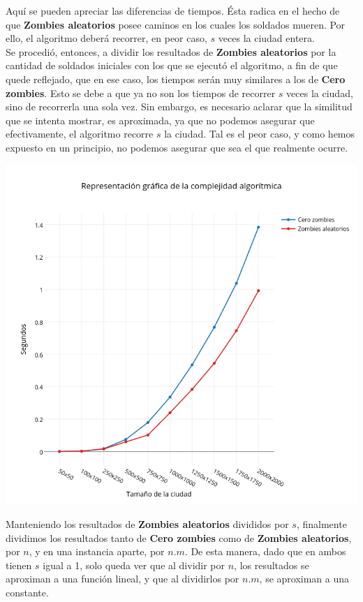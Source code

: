 Aquí se pueden apreciar las diferencias de tiempos. Ésta radica en el hecho de que \textbf{Zombies aleatorios} posee caminos en los cuales los soldados mueren. Por ello, el algoritmo deberá recorrer, en peor caso, $s$ veces la ciudad entera.\\

Se procedió, entonces, a dividir los resultados de \textbf{Zombies aleatorios} por la cantidad de soldados iniciales con los que se ejecutó el algoritmo, a fin de que quede reflejado, que en ese caso, los tiempos serán muy similares a los de \textbf{Cero zombies}. Esto se debe a que ya no son los tiempos de recorrer $s$ veces la ciudad, sino de recorrerla una sola vez.
Sin embargo, es necesario aclarar que la similitud que se intenta mostrar, es aproximada, ya que no podemos asegurar que efectivamente, el algoritmo recorre $s$ la ciudad. Tal es el peor caso, y como hemos expuesto en un principio, no podemos asegurar que sea el que realmente ocurre.

\includegraphics[width=15cm,keepaspectratio=yes]{imagenes/ej2/zaczados.png}

Manteniendo los resultados de \textbf{Zombies aleatorios} divididos por $s$, finalmente dividimos los resultados tanto de \textbf{Cero zombies} como de \textbf{Zombies aleatorios}, por $n$, y en una instancia aparte, por $n.m$.
De esta manera, dado que en ambos tienen $s$ igual a 1, solo queda ver que al dividir por $n$, los resultados se aproximan a una función lineal, y que al dividirlos por $n.m$, se aproximan a una constante.\\

